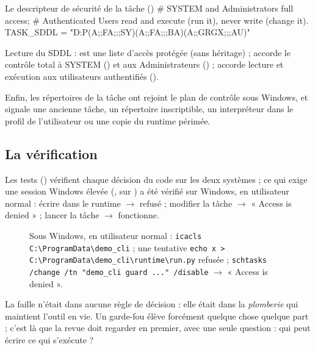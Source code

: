 \begin{code}{Le descripteur de sécurité de la tâche ()}
# SYSTEM and Administrators full access;
# Authenticated Users read and execute (run it), never write (change it).
TASK_SDDL = "D:P(A;;FA;;;SY)(A;;FA;;;BA)(A;;GRGX;;;AU)"
\end{code}

Lecture du SDDL :  est une liste d'accès protégée (sans héritage) ;  accorde le
contrôle total à SYSTEM () et aux Administrateurs () ;  accorde lecture
et exécution aux utilisateurs authentifiés ().

Enfin, les répertoires de la tâche ont rejoint le plan de contrôle sous Windows, et
 signale une ancienne tâche, un répertoire inscriptible, un interpréteur
dans le profil de l'utilisateur ou une copie du runtime périmée.

\subsection{La vérification}
Les tests () vérifient chaque décision du code sur les deux systèmes ;
ce qui exige une session Windows élevée (,  sur
) a été vérifié sur Windows, en utilisateur normal : écrire dans le runtime
$\rightarrow$ refusé ; modifier la tâche $\rightarrow$ « Access is denied » ; lancer la tâche
$\rightarrow$ fonctionne.

\begin{figure}[htbp]
\centering
{}%
{Sous Windows, en utilisateur normal : \texttt{icacls C:\textbackslash ProgramData\textbackslash demo\_cli} ; une tentative \texttt{echo x > C:\textbackslash ProgramData\textbackslash demo\_cli\textbackslash runtime\textbackslash run.py} refusée ; \texttt{schtasks /change /tn "demo\_cli guard ..." /disable} $\rightarrow$ « Access is denied ».}
\end{figure}

\begin{pourquoi}
La faille n'était dans aucune règle de décision : elle était dans la \emph{plomberie} qui
maintient l'outil en vie. Un garde-fou élève forcément quelque chose quelque part ; c'est là
que la revue doit regarder en premier, avec une seule question : qui peut écrire ce qui
s'exécute ?
\end{pourquoi}
